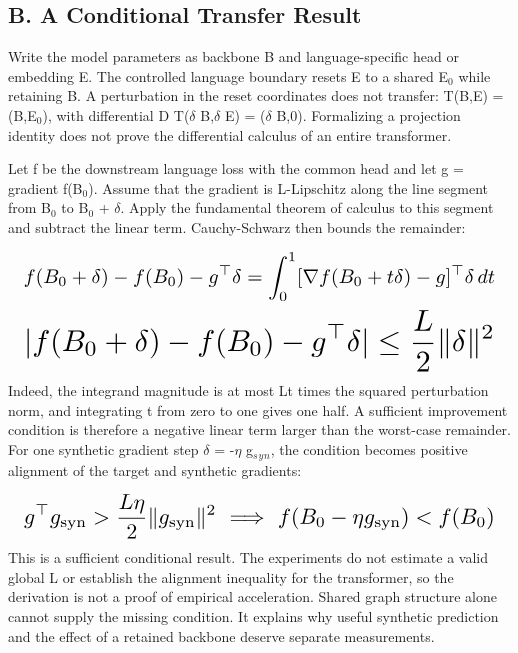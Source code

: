\documentclass[10pt,letterpaper,twocolumn]{article}
\begin{document}
\subsection*{B. A Conditional Transfer Result}
Write the model parameters as backbone B and language-specific head or embedding E. The controlled language boundary resets E to a shared E\ensuremath{_0} while retaining B. A perturbation in the reset coordinates does not transfer: T(B,E) = (B,E\ensuremath{_0}), with differential D T(\ensuremath{\delta} B,\ensuremath{\delta} E) = (\ensuremath{\delta} B,0). Formalizing a projection identity does not prove the differential calculus of an entire transformer.

Let f be the downstream language loss with the common head and let g = gradient f(B\ensuremath{_0}). Assume that the gradient is L-Lipschitz along the line segment from B\ensuremath{_0} to B\ensuremath{_0} + \ensuremath{\delta}. Apply the fundamental theorem of calculus to this segment and subtract the linear term. Cauchy-Schwarz then bounds the remainder:

\begin{equation}
\resizebox{.98\columnwidth}{!}{$\displaystyle f(B_0+\delta)-f(B_0)-g^\top\delta=\int_0^1[\nabla f(B_0+t\delta)-g]^\top\delta\,dt$}
\end{equation}
\begin{equation}
\resizebox{.98\columnwidth}{!}{$\displaystyle |f(B_0+\delta)-f(B_0)-g^\top\delta|\leq \frac{L}{2}\|\delta\|^2$}
\end{equation}
Indeed, the integrand magnitude is at most Lt times the squared perturbation norm, and integrating t from zero to one gives one half. A sufficient improvement condition is therefore a negative linear term larger than the worst-case remainder. For one synthetic gradient step \ensuremath{\delta} = -\ensuremath{\eta} g\ensuremath{_s}\ensuremath{_y}\ensuremath{_n}, the condition becomes positive alignment of the target and synthetic gradients:

\begin{equation}
\resizebox{.98\columnwidth}{!}{$\displaystyle g^\top g_{\rm syn}>\frac{L\eta}{2}\|g_{\rm syn}\|^2\ \Longrightarrow\ f(B_0-\eta g_{\rm syn})<f(B_0)$}
\end{equation}
This is a sufficient conditional result. The experiments do not estimate a valid global L or establish the alignment inequality for the transformer, so the derivation is not a proof of empirical acceleration. Shared graph structure alone cannot supply the missing condition. It explains why useful synthetic prediction and the effect of a retained backbone deserve separate measurements.
\end{document}
